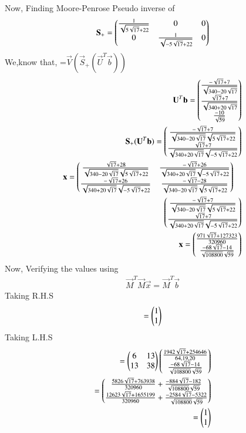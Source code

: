 \documentclass[journal,12pt,twocolumn]{IEEEtran}
\begin{document}
Now, Finding Moore-Penrose Pseudo inverse of 
\begin{align}
\mathbf{S}_+=\begin{pmatrix}\frac{1}{\sqrt{5\sqrt{17}+22}}&0&0\\0&\frac{1}{\sqrt{-5\sqrt{17}+22}}&0\end{pmatrix}
\end{align}
We,know that,
=$\vec{V}(\vec{S}_+(\vec{U}^T\vec{b}))$
\begin{align}
\vec{U}^T\vec{b}=\myvec{\frac{-\sqrt{17}+7}{\sqrt{340-20\sqrt{17}}}\\\frac{\sqrt{17}+7}{\sqrt{340+20\sqrt{17}}}\\\frac{-10}{\sqrt{59}}}\\
\vec{S}_+(\vec{U}^T\vec{b})=\myvec{\frac{-\sqrt{17}+7}{\sqrt{340-20\sqrt{17}}\sqrt{5\sqrt{17}+22}}\\\frac{\sqrt{17}+7}{\sqrt{340+20\sqrt{17}}\sqrt{-5\sqrt{17}+22}}}\\
\begin{multlined}
\vec{x}=\myvec{\frac{\sqrt{17}+28}{\sqrt{340-20\sqrt{17}}\sqrt{5\sqrt{17}+22}}&\frac{-\sqrt{17}+26}{\sqrt{340+20\sqrt{17}}\sqrt{-5\sqrt{17}+22}}\\\frac{-\sqrt{17}+26}{\sqrt{340+20\sqrt{17}}\sqrt{-5\sqrt{17}+22}}&\frac{-\sqrt{17}-28}{\sqrt{340-20\sqrt{17}}\sqrt{5\sqrt{17}+22}}}\\
\myvec{\frac{-\sqrt{17}+7}{\sqrt{340-20\sqrt{17}}\sqrt{5\sqrt{17}+22}}\\\frac{\sqrt{17}+7}{\sqrt{340+20\sqrt{17}}\sqrt{-5\sqrt{17}+22}}}
\end{multlined}\\
\vec{x}=\myvec{\frac{971\sqrt{17}+127323}{320960}\\\frac{-68\sqrt{17}-14}{\sqrt{108800}\sqrt{59}}}
\end{align}
Now, Verifying the values using
\begin{align}
\vec{M}^T\vec{M}\vec{x} = \vec{M}^T\vec{b}
\end{align}
Taking R.H.S
\begin{align}
=\begin{pmatrix}1\\1\end{pmatrix}
\end{align}
Taking L.H.S
\begin{align}
=\begin{pmatrix}6&13\\13&38\end{pmatrix}\begin{pmatrix}\frac{1942\sqrt{17}+254646}{64,19,20}\\\frac{-68\sqrt{17}-14}{\sqrt{108800}\sqrt{59}}\end{pmatrix}\\
=\begin{pmatrix}\frac{5826\sqrt{17}+763938}{320960}+\frac{-884\sqrt{17}-182}{\sqrt{108800}\sqrt{59}}\\\frac{12623\sqrt{17}+1655199}{320960}+\frac{-2584\sqrt{17}-5322}{\sqrt{108800}\sqrt{59}}\end{pmatrix}\\
=\begin{pmatrix}1\\1\end{pmatrix}
\end{align}
 
\end{document}
